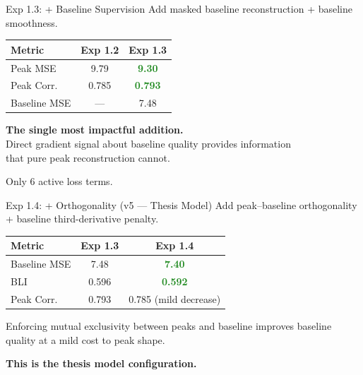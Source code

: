 \documentclass[aspectratio=169, 10pt]{beamer}
\newcommand{\cmark}{\textcolor{forestgreen}{\ding{51}}}
\begin{document}
\begin{frame}{Exp 1.3: + Baseline Supervision}
Add masked baseline reconstruction + baseline smoothness.

\vspace{0.5em}
\centering
\begin{tabular}{lcc}
\toprule
\textbf{Metric} & \textbf{Exp 1.2} & \textbf{Exp 1.3} \\
\midrule
Peak MSE        & 9.79 & \textcolor{forestgreen}{\textbf{9.30}} \\
Peak Corr.      & 0.785 & \textcolor{forestgreen}{\textbf{0.793}} \\
Baseline MSE    & --- & 7.48 \\
\bottomrule
\end{tabular}

\vspace{0.8em}
\begin{resultgood}
\centering
\textbf{The single most impactful addition.}\\[3pt]
Direct gradient signal about baseline quality provides information\\that pure peak reconstruction cannot.
\end{resultgood}

\vspace{0.3em}
{\small Only 6 active loss terms.}
\end{frame}

\begin{frame}{Exp 1.4: + Orthogonality (v5 --- Thesis Model)}
Add peak--baseline orthogonality + baseline third-derivative penalty.

\vspace{0.5em}
\centering
\begin{tabular}{lcc}
\toprule
\textbf{Metric} & \textbf{Exp 1.3} & \textbf{Exp 1.4} \\
\midrule
Baseline MSE    & 7.48 & \textcolor{forestgreen}{\textbf{7.40}} \cmark \\
BLI             & 0.596 & \textcolor{forestgreen}{\textbf{0.592}} \cmark \\
Peak Corr.      & 0.793 & 0.785 {\scriptsize (mild decrease)} \\
\bottomrule
\end{tabular}

\vspace{0.8em}
\begin{insightbox}
Enforcing mutual exclusivity between peaks and baseline improves baseline quality at a mild cost to peak shape.
\end{insightbox}

\vspace{0.3em}
{\small \textbf{This is the thesis model configuration.}}
\end{frame}
\end{document}
